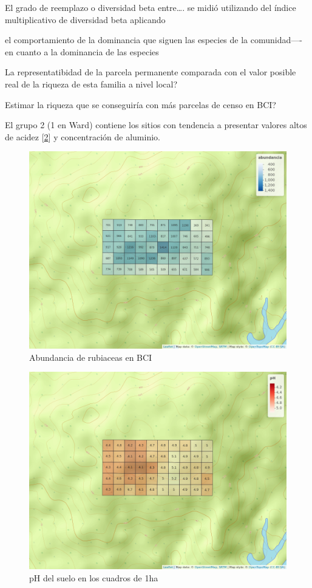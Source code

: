 \documentclass[11pt,]{article}
\begin{document}
El grado de reemplazo o diversidad beta entre\ldots{}. se midió
utilizando del índice multiplicativo de diversidad beta aplicando

el comportamiento de la dominancia que siguen las especies de la
comunidad---- en cuanto a la dominancia de las especies

La representatibidad de la parcela permanente comparada con el valor
posible real de la riqueza de esta familia a nivel local?

Estimar la riqueza que se conseguiría con más parcelas de censo en BCI?

El grupo 2 (1 en Ward) contiene los sitios con tendencia a presentar
valores altos de acidez {[}\ref{fig:mapa_cuadros_ph}{]} y concentración
de aluminio.

\begin{figure}
\centering
\includegraphics{mapa_cuadros_abun_rubic.png}
\caption{Abundancia de rubiaceas en BCI
\label{fig:mapa_cuadros_abun_rubic}}
\end{figure}

\begin{figure}
\centering
\includegraphics{mapa_cuadros_ph.png}
\caption{pH del suelo en los cuadros de 1ha \label{fig:mapa_cuadros_ph}}
\end{figure}
\end{document}
